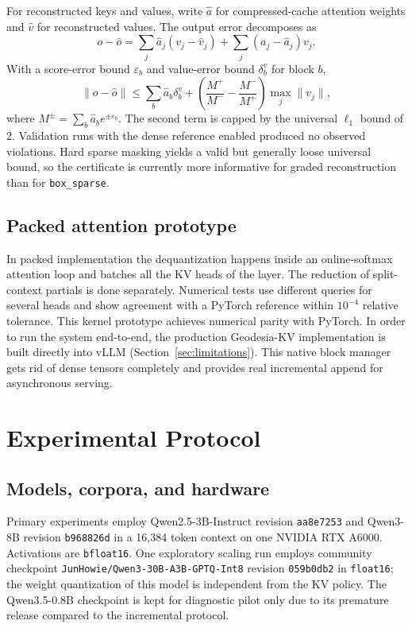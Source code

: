 \documentclass[10pt,twocolumn]{article}
\newcommand{\method}{Geodesia-KV}
\begin{document}
For reconstructed keys and values, write $\hat a$ for compressed-cache
attention weights and $\hat v$ for reconstructed values. The output error
decomposes as
\[
o-\hat o=\sum_j\hat a_j(v_j-\hat v_j)
          +\sum_j(a_j-\hat a_j)v_j.
\]
With a score-error bound $\varepsilon_b$ and value-error bound
$\delta_b^v$ for block $b$,
\begin{equation}
\|o-\hat o\|
\leq \sum_b\hat a_b\delta_b^v
+\left(\frac{M^+}{M^-}-\frac{M^-}{M^+}\right)
\max_j\|v_j\|,
\label{eq:certificate}
\end{equation}
where $M^\pm=\sum_b\hat a_b e^{\pm\varepsilon_b}$. The second term is capped by
the universal $\ell_1$ bound of 2. Validation runs with the dense reference
enabled produced no observed violations. Hard sparse masking yields a valid
but generally loose universal bound, so the certificate is currently more
informative for graded reconstruction than for \texttt{box\_sparse}.
\subsection{Packed attention prototype}

In packed implementation the dequantization happens inside an online-softmax
attention loop and batches all the KV heads of the layer. The reduction of
split-context partials is done separately. Numerical tests use different queries
for several heads and show agreement with a PyTorch reference within $10^{-4}$
relative tolerance. This kernel prototype achieves numerical parity with
PyTorch. In order to run the system end-to-end, the production \method{}
implementation is built directly into vLLM (Section~\ref{sec:limitations}). This
native block manager gets rid of dense tensors completely and provides real
incremental append for asynchronous serving.

\section{Experimental Protocol}

\subsection{Models, corpora, and hardware}

Primary experiments employ Qwen2.5-3B-Instruct revision
\texttt{aa8e7253} and Qwen3-8B revision \texttt{b968826d} in a 16,384 token
context on one NVIDIA RTX A6000. Activations are \texttt{bfloat16}. One exploratory
scaling run employs community checkpoint
\texttt{JunHowie/Qwen3-30B-A3B-GPTQ-Int8} revision
\texttt{059b0db2} in \texttt{float16}; the weight quantization of this model
is independent from the KV policy. The Qwen3.5-0.8B checkpoint is kept for
diagnostic pilot only due to its premature release compared to the incremental
protocol.
\end{document}
